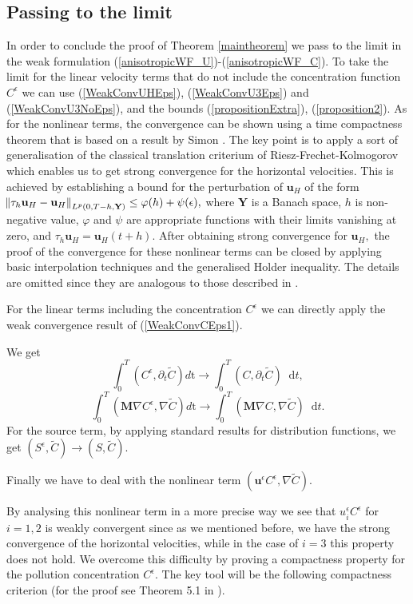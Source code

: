 \documentclass[11pt]{article}
\newcommand*\diff{\mathop{}\!\mathrm{d}}
\begin{document}
\subsection{Passing to the limit}

In order to conclude the proof of Theorem \ref{maintheorem} we pass to the limit in the weak formulation (\ref{anisotropicWF_U})-(\ref{anisotropicWF_C}). To take the limit for the linear velocity terms that do not include the concentration function $C^\epsilon$ we can use (\ref{WeakConvUHEps}), (\ref{WeakConvU3Eps}) and (\ref{WeakConvU3NoEps}), and the bounds (\ref{propositionExtra}), (\ref{proposition2}). As for the nonlinear terms, the convergence can be shown using a time compactness theorem that is based on a result by Simon \cite{simon1986compact}. The key point is to apply a sort of generalisation of the classical translation criterium of Riesz-Frechet-Kolmogorov which enables us to get strong convergence for the horizontal velocities. This is achieved by establishing a bound for the perturbation of $\mathbf{u}_H$ of the form $\norm{\tau_h \mathbf{u}_H - \mathbf{u}_H}_{L^p(0,T-h, \mathbf{Y})} \leq \varphi(h) + \psi(\epsilon),$ where $\mathbf{Y}$ is a Banach space, $h$ is non-negative value, $\varphi$ and $\psi$ are appropriate functions with their limits vanishing at zero, and $\tau_h \mathbf{u}_H = \mathbf{u}_H (t+h) $. After obtaining strong convergence for $\mathbf{u}_H,$ the proof of the convergence for these nonlinear terms can be closed by applying basic interpolation techniques and the generalised Holder inequality. The details are omitted since they are analogous to those described in \cite{azerad2001mathematical}.

For the linear terms including the concentration $C^\epsilon$ we can directly apply the weak convergence result of (\ref{WeakConvCEps1}).

We get
%
\[ \int_0 ^ T (C^\epsilon , \partial_t \tilde{C}) d \mathrm{t} \to \int_0^T (C, \partial_t \tilde{C}) \diff t,\]
%
\[ \int_0 ^ T (\mathbf{M} \nabla C^\epsilon, \nabla \tilde{C}) d \mathrm{t} \to \int_0^T (\mathbf{M} \nabla C, \nabla \tilde{C}) \diff t.\]
%
For the source term, by applying standard results for distribution functions, we get $(S^\epsilon, \tilde{C}) \to (S, \tilde{C}).$ 

Finally we have to deal with the nonlinear term $(\mathbf{u}^\epsilon C^\epsilon, \nabla \tilde{C}).$

By analysing this nonlinear term in a more precise way we see that $u^\epsilon_i C^\epsilon$ for $i=1,2$ is weakly convergent since as we mentioned before, we have the strong convergence of the horizontal velocities, while in the case of $i=3$ this property does not hold. We overcome this difficulty by proving a compactness property for the pollution concentration $C^\epsilon.$ The key tool will be the following compactness criterion (for the proof see Theorem 5.1 in \cite{azerad2001mathematical}).
\end{document}
